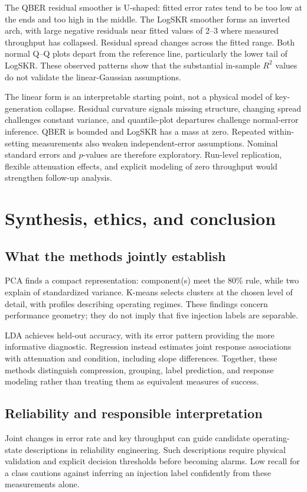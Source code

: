 \documentclass[11pt]{article}
\begin{document}
The QBER residual smoother is U-shaped: fitted error rates tend to be too low at the ends and too high in the middle. The LogSKR smoother forms an inverted arch, with large negative residuals near fitted values of 2--3 where measured throughput has collapsed. Residual spread changes across the fitted range. Both normal Q--Q plots depart from the reference line, particularly the lower tail of LogSKR. These observed patterns show that the substantial in-sample $R^2$ values do not validate the linear-Gaussian assumptions.

The linear form is an interpretable starting point, not a physical model of key-generation collapse. Residual curvature signals missing structure, changing spread challenges constant variance, and quantile-plot departures challenge normal-error inference. QBER is bounded and LogSKR has a mass at zero. Repeated within-setting measurements also weaken independent-error assumptions. Nominal standard errors and $p$-values are therefore exploratory. Run-level replication, flexible attenuation effects, and explicit modeling of zero throughput would strengthen follow-up analysis.
\FloatBarrier

\section{Synthesis, ethics, and conclusion}
\subsection{What the methods jointly establish}
PCA finds a compact representation: \NPCOptimal{} component(s) meet the 80\% rule, while two explain \PCTwoCum{} of standardized variance. K-means selects \KOptimal{} clusters at the chosen level of detail, with profiles describing operating regimes. These findings concern performance geometry; they do not imply that five injection labels are separable.

LDA achieves \LDAAccuracy{} held-out accuracy, with its error pattern providing the more informative diagnostic. Regression instead estimates joint response associations with attenuation and condition, including slope differences. Together, these methods distinguish compression, grouping, label prediction, and response modeling rather than treating them as equivalent measures of success.

\subsection{Reliability and responsible interpretation}
Joint changes in error rate and key throughput can guide candidate operating-state descriptions in reliability engineering. Such descriptions require physical validation and explicit decision thresholds before becoming alarms. Low recall for a class cautions against inferring an injection label confidently from these measurements alone.
\end{document}
